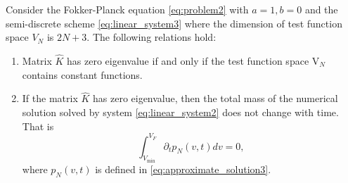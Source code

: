 \begin{proposition}\label{prop1}
    Consider the Fokker-Planck equation \eqref{eq:problem2} with $a=1, b=0$ and the semi-discrete scheme \eqref{eq:linear_system3} where the dimension of test function space $V_N$ is $2N+3$. The following relations hold:
\begin{enumerate}
    \item Matrix $\hat{K}$ has zero eigenvalue if and only if the test function space $\mathrm{V}_N$ contains constant functions.
    \item If the matrix $\hat{K}$ has zero eigenvalue, then the total mass of the numerical solution solved by system \eqref{eq:linear_system2} does not change with time. That is
    \begin{equation}
        \int_{V_{\min}}^{V_F}\partial_tp_N(v,t) dv=0,
    \end{equation}
    where $p_N(v,t)$ is defined in \eqref{eq:approximate_solution3}.
\end{enumerate}
\end{proposition}
